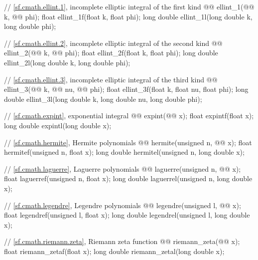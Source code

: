 \begin{codeblock}
{  // \ref{sf.cmath.ellint.1}, incomplete elliptic integral of the first kind
  @@ ellint_1(@@ k, @@ phi);
  float               ellint_1f(float k, float phi);
  long double         ellint_1l(long double k, long double phi);

  // \ref{sf.cmath.ellint.2}, incomplete elliptic integral of the second kind
  @@ ellint_2(@@ k, @@ phi);
  float               ellint_2f(float k, float phi);
  long double         ellint_2l(long double k, long double phi);

  // \ref{sf.cmath.ellint.3}, incomplete elliptic integral of the third kind
  @@ ellint_3(@@ k, @@ nu,
                                 @@ phi);
  float               ellint_3f(float k, float nu, float phi);
  long double         ellint_3l(long double k, long double nu, long double phi);

  // \ref{sf.cmath.expint}, exponential integral
  @@ expint(@@ x);
  float               expintf(float x);
  long double         expintl(long double x);

  // \ref{sf.cmath.hermite}, Hermite polynomials
  @@ hermite(unsigned n, @@ x);
  float               hermitef(unsigned n, float x);
  long double         hermitel(unsigned n, long double x);

  // \ref{sf.cmath.laguerre}, Laguerre polynomials
  @@ laguerre(unsigned n, @@ x);
  float               laguerref(unsigned n, float x);
  long double         laguerrel(unsigned n, long double x);

  // \ref{sf.cmath.legendre}, Legendre polynomials
  @@ legendre(unsigned l, @@ x);
  float               legendref(unsigned l, float x);
  long double         legendrel(unsigned l, long double x);

  // \ref{sf.cmath.riemann.zeta}, Riemann zeta function
  @@ riemann_zeta(@@ x);
  float               riemann_zetaf(float x);
  long double         riemann_zetal(long double x);

}
\end{codeblock}
